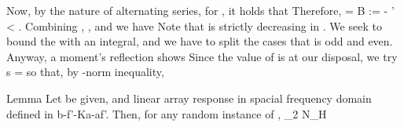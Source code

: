Now, by the nature of alternating series, for , it holds that
%
Therefore,
%
 {
\NC {}
= \NC {} {} \NR
%
\NC \leq \NC B  \NR
%
\NC := \NC {} { } \NR
%
\NC - \pi \leq \NC \psi' < \pi. \NR
}
%
Combining , , and  we have
%
%
Note that  is strictly decreasing in .
We seek to bound the  with an integral, and we have to split the cases that  is odd and even.
Anyway, a moment's reflection shows
%
%
Since the value of  is at our disposal, we try
%
 {
\NC s
=\NC {} \NR
}
%
so that, by -norm inequality, 

\Result
{Lemma}
{
Let \m {\f } be given, and linear array response in spacial frequency domain  defined in {b-f'-Ka-af'}.
Then, for any random instance of \m {\f},
%
 {
\NC {} _2
\leq \NC {} {\pi} \log N_H \NR
}
}

\stopsubsection

\startsubsection [title={Norm of Angular Channel Response}]

